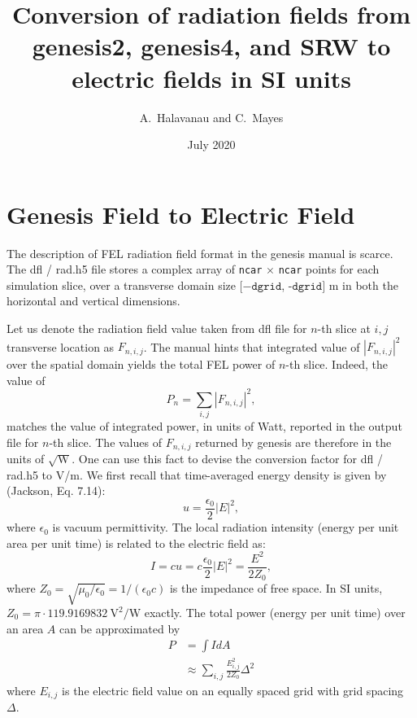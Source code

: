 \documentclass{article}
\title{Conversion of radiation fields from genesis2, genesis4, and SRW to electric fields in SI units}
\author{A.~Halavanau and C.~Mayes}
\date{July 2020}
\begin{document}
\maketitle



\section{Genesis Field to Electric Field}
The description of FEL radiation field format in the {\sc genesis} manual is scarce. The {\sc dfl} / {\sc rad.h5} file stores a complex array of \texttt{ncar} $\times$ \texttt{ncar} points for each simulation slice, over a transverse domain size $[-\texttt{dgrid}$, -$\texttt{dgrid}]$ m in both the horizontal and vertical dimensions.

Let us denote the radiation field value taken from {\sc dfl} file for $n$-th slice at $i,j$ transverse location as $F_{n,i,j}$.
The manual hints that integrated value of $|F_{n,i,j}|^2$ over the spatial domain yields the total FEL power of $n$-th slice.
Indeed, the value of
\begin{equation}
P_n = \sum_{i,j}{|F_{n,i,j}|^2},
\end{equation}
 matches the value of integrated power, in units of Watt, reported in the output file for $n$-th slice. The values of $F_{n,i,j}$ returned by {\sc genesis} are therefore in the units of $\sqrt{\textrm{W}}$.
 One can use this fact to devise the conversion factor for {\sc dfl} / {\sc rad.h5} to V/m.
We first recall that time-averaged energy density is given by (Jackson, Eq. 7.14):
\begin{equation}
    u = \frac{\epsilon_0}{2} |E|^2,
\end{equation}
where $\epsilon_0$ is vacuum permittivity. The local
radiation intensity (energy per unit area per unit time) is related to the electric field as:
\begin{equation}
    I = c u = c \frac{\epsilon_0}{2} |E|^2 = \frac{E^2}{2 Z_0},
\end{equation}
where $Z_0 = \sqrt{\mu_0/\epsilon_0} =  1/(\epsilon_0 c)$ is the impedance of free space. In SI units, $Z_0 = \pi\cdot119.9169832  ~\textrm{V}^2/\textrm{W}$ exactly.  The total power (energy per unit time) over an area $A$ can be approximated by
\begin{align*}
    P &= \int I dA \\
      &\approx \sum_{i,j}  \frac{E_{i,j}^2}{2 Z_0} \Delta^2
\end{align*}
where $E_{i,j}$ is the electric field value on an equally spaced grid with grid spacing $\Delta$.
\end{document}
